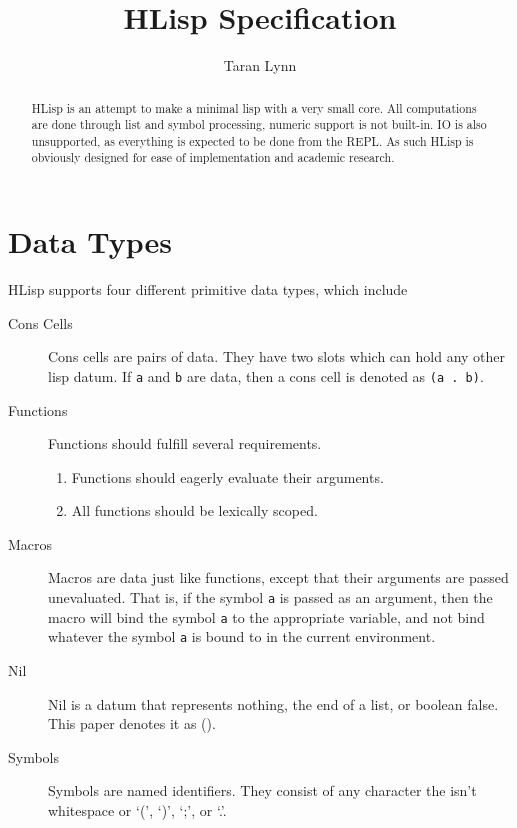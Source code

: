 \documentclass[12pt]{article}
\title{HLisp Specification}
\author{Taran Lynn}
\begin{document}
\maketitle

\begin{abstract}
  HLisp is an attempt to make a minimal lisp with a very small core. All
  computations are done through list and symbol processing, numeric support is
  not built-in. IO is also unsupported, as everything is expected to be done from
  the REPL. As such HLisp is obviously designed for ease of implementation and
  academic research.
\end{abstract}

\tableofcontents

\pagebreak



\section{Data Types}

HLisp supports four different primitive data types, which include

\begin{description}
\item[Cons Cells] Cons cells are pairs of data. They have two slots which can
  hold any other lisp datum. If \verb!a! and \verb!b! are data, then a cons
  cell is denoted as \verb!(a . b)!.

\item[Functions] Functions should fulfill several requirements.
  \begin{enumerate}
  \item Functions should eagerly evaluate their arguments.

  \item All functions should be lexically scoped.
  \end{enumerate}

\item[Macros] Macros are data just like functions, except that their arguments
  are passed unevaluated. That is, if the symbol \verb!a! is passed as an
  argument, then the macro will bind the symbol \verb!a! to the appropriate
  variable, and not bind whatever the symbol \verb!a! is bound to in the current
  environment.

\item[Nil] Nil is a datum that represents nothing, the end of a list, or boolean
  false. This paper denotes it as ().

\item[Symbols] Symbols are named identifiers. They consist of any character the
  isn't whitespace or `(', `)', `;', or `.'.
\end{description}
\end{document}
